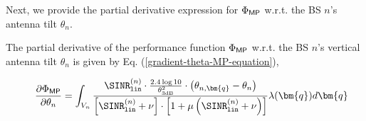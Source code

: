 Next, we provide the partial derivative expression for $\Phi_{{\sf MP}}$ w.r.t. the BS $n$'s antenna tilt $\theta_n$.


\begin{Proposition}\label{gradient-theta-MP}
    The partial derivative of the performance function $\Phi_{{\sf MP}}$ w.r.t. the BS $n$'s vertical antenna tilt $\theta_n$ is given by Eq. (\ref{gradient-theta-MP-equation}),
\begin{figure*}[t!]
\begin{multline}\label{gradient-theta-MP-equation}
    \frac{\partial \Phi_{{\sf MP}}}{\partial \theta_n} =   \int_{V_n}  \frac{ \SINR^{(n)}_{\mathtt{lin}} \cdot \frac{2.4 \log 10}{\theta^2_{\textrm{3dB}}} \cdot \left(\theta_{n,\bm{q}} - \theta_n \right)}{\left[\SINR^{(n)}_{\mathtt{lin}} + \nu \right] \cdot \left[ 1 + \mu \left( \SINR^{(n)}_{\mathtt{lin}} + \nu \right) \right] }  \lambda(\bm{q})d\bm{q} \\

\end{multline}
\end{figure*}
\end{Proposition}
